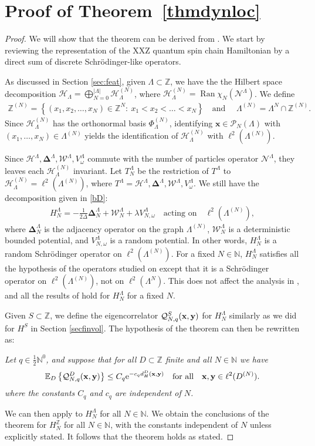 \documentclass[12pt, a4paper,reqno]{amsart}
\numberwithin{equation}{section}
\DeclareMathOperator{\Ran}{Ran}
\renewcommand\H{\mathcal{H}}
\newcommand\N{\mathbb N}
\newcommand\Z{\mathbb Z}
\newcommand\cW{\mathcal{W}}
\newcommand\x{\mathbf{x}}
\newcommand\y{\mathbf{y}}
\newcommand\e{\mathrm{e}}
\newcommand\E{\mathbb E}
\newcommand\cH{\mathcal{H}}
\newcommand\cQ{\mathcal{Q}}
\newcommand\cP{\mathcal{P}}
\newcommand\be{\begin{equation}\begin{aligned}}
\newcommand\ee{\end{aligned}\end{equation}}
\newcommand{\abs}[1]{\left\lvert #1 \right\rvert}
\newcommand{\set}[1]{\left\{ #1 \right\}}
\newcommand\La{\Lambda}
\newcommand{\eq}[1]{\eqref{#1}}
\newcommand{\up}[1]{^{\left(#1\right)}}
\newcommand{\qtx}[1]{\quad\text{#1}\quad}
\newcommand{\bD}{\boldsymbol{\Delta}}
\begin{document}
\section{Proof of Theorem~\ref{thmdynloc}}\label{sec:main}



\begin{proof}  
We will show that the theorem can be derived from \cite[Theorem 4.1]{AW2}.
We start by reviewing the representation of the XXZ  quantum spin chain Hamiltonian by  a direct sum of discrete Schr\"odinger-like operators.

 As discussed in Section \ref{sec:feat},  given $\La \subset \Z$, we have the the Hilbert space decomposition $ \cH_\La= \bigoplus_{N=0}^{\abs{\La}} \cH_\La\up{N}$, where   $\cH_\Lambda\up{N}=\Ran {\chi_N(\mathcal N^\Lambda)}$.  We define
\be
\Z\up{N} = \set{(x_1,x_2,\ldots,x_N) \in \Z^N: \  x_1 < x_2<\ldots < x_N  } \qtx{and }\La\up{N}= \La^N \cap\Z\up{N}.
\ee
  Since $\cH_\La\up{N}$ has the orthonormal basis $\Phi_\La\up{N}$, 
 identifying   $\x\in \cP_N(\La)$ with $(x_1,\ldots,x_N)\in \La\up{N}$ yields the identification of $ \cH_\La\up{N}$ with $\ell^2(\La\up{N})$.


Since  $\H^\La, \bD^\Lambda, \cW^\Lambda, V^\La_\omega$ commute with the number of particles operator $\mathcal N^\Lambda$, they leaves each $\cH_\La\up{N}$ invariant.  Let  $T_N^\La$ be the restriction of
$T^\La$ to  $\cH_\La\up{N}=\ell^2(\La\up{N})$, where  $T^\La= \H^\La, \bD^\Lambda, \cW^\Lambda, V^\La_\omega$. 
We still have the decomposition given in \eq{bD}:
\be
H_N^\La= -\tfrac 1 {2\Delta} \bD^\Lambda_N +\cW^\Lambda_N +\lambda   V^\La_{N,\omega} \qtx{acting on} \ell^2(\La\up{N}),
\ee
where  $\bD^\Lambda_N $  is the adjacency operator on the graph $\La\up{N}$,  $\cW^\Lambda_N$ is a deterministic bounded potential, and $V^\La_{N,\omega}$ is a random potential.  In other words, $H_N^\La$
is a random Schr\"odinger operator on $\ell^2(\La\up{N})$.    For a fixed $N\in \N$, $H_N^\La$ satisfies all the 
hypothesis of the operators studied on \cite{AW2} except that it is  a Schr\"odinger operator on $\ell^2(\La\up{N})$,
not  on $\ell^2(\La^N)$.  This does not affect the analysis in \cite{AW2}, and all the results of \cite{AW2} hold for $H_N^\La$ for a fixed $N$.


Given $S\subset \Z$, we define the eigencorrelator   $\cQ^S_{N,q}({\bf x},{\bf y}) $ for $H_N^\La$ similarly  as we did for $H^S$  in Section \ref{secfinvol}. The hypothesis of the theorem can then be rewritten as:


\emph{Let $q\in \frac 12 \N^0$, and suppose that for all $D\subset \Z$ finite  and all  $N\in \N$ we have
 \be %
\E_{D}\set{\cQ_{N,q}^D ({\bf x},{\bf y})}\le  C_q \e^{-c_q  d_{H}^D({\bf x},{\bf y})}  \qtx{for all}\x,\y\in \ell^2(D\up{N}).
\ee
where the constants $C_q$ and $c_q$ are independent of $N$.}

We can then apply \cite[Theorem 4.1]{AW2}  to $H_N^\La$ for all $N\in \N$. We
 obtain the conclusions of  the theorem for  $H_N^\Z$ for all $N\in \N$, with the constants independent of $N$ unless explicitly  stated.  It follows that the theorem holds as stated.
\end{proof}
\end{document}
